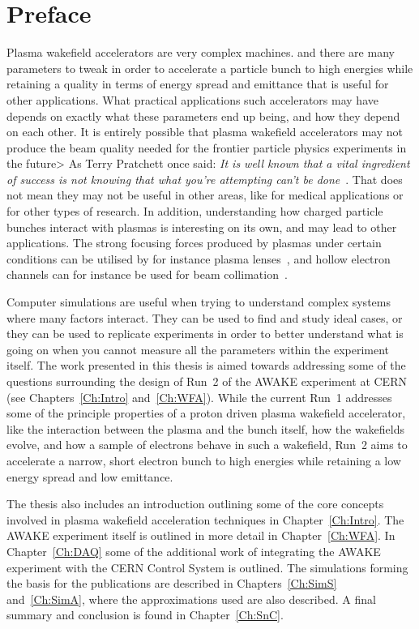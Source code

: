 \chapter*{Preface}

Plasma wakefield accelerators are very complex machines. and there are many parameters to tweak in order to accelerate a particle bunch to high energies while retaining a quality in terms of energy spread and emittance that is useful for other applications.
What practical applications such accelerators may have depends on exactly what these parameters end up being, and how they depend on each other.
It is entirely possible that plasma wakefield accelerators may not produce the beam quality needed for the frontier particle physics experiments in the future>
As Terry Pratchett once said: \textit{It is well known that a vital ingredient of success is not knowing that what you're attempting can't be done}~\cite{pratchett:1987}.
That does not mean they may not be useful in other areas, like for medical applications or for other types of research.
In addition, understanding how charged particle bunches interact with plasmas is interesting on its own, and may lead to other applications.
The strong focusing forces produced by plasmas under certain conditions can be utilised by for instance plasma lenses~\cite{su:1990}, and hollow electron channels can for instance be used for beam collimation~\cite{stancari:2014}.

Computer simulations are useful when trying to  understand complex systems where many factors interact.
They can be used to find and study ideal cases, or they can be used to replicate experiments in order to better understand what is going on when you cannot measure all the parameters within the experiment itself.
The work presented in this thesis is aimed towards addressing some of the questions surrounding the design of Run~2 of the AWAKE experiment at CERN (see Chapters~\ref{Ch:Intro} and~\ref{Ch:WFA}).
While the current Run~1 addresses some of the principle properties of a proton driven plasma wakefield accelerator, like the interaction between the plasma and the bunch itself, how the wakefields evolve, and how a sample of electrons behave in such a wakefield, Run~2 aims to accelerate a narrow, short electron bunch to high energies while retaining a low energy spread and low emittance.

The thesis also includes an introduction outlining some of the core concepts involved in plasma wakefield acceleration techniques in Chapter~\ref{Ch:Intro}.
The AWAKE experiment itself is outlined in more detail in Chapter~\ref{Ch:WFA}.
In Chapter~\ref{Ch:DAQ} some of the additional work of integrating the AWAKE experiment with the CERN Control System is outlined.
The simulations forming the basis for the publications are described in Chapters~\ref{Ch:SimS} and~\ref{Ch:SimA}, where the approximations used are also described.
A final summary and conclusion is found in Chapter~\ref{Ch:SnC}.

